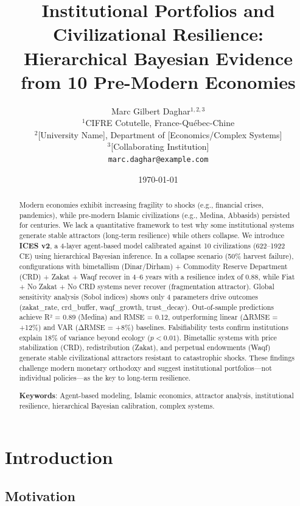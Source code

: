 \documentclass[12pt,a4paper]{article}
\title{
    \textbf{Institutional Portfolios and Civilizational Resilience:} \\
    \large Hierarchical Bayesian Evidence from 10 Pre-Modern Economies
}
\author{
    Marc Gilbert Daghar$^{1,2,3}$ \\
    \small $^1$CIFRE Cotutelle, France-Québec-Chine \\
    \small $^2$[University Name], Department of [Economics/Complex Systems] \\
    \small $^3$[Collaborating Institution] \\
    \texttt{marc.daghar@example.com}
}
\date{\today}
\begin{document}
\maketitle

\begin{abstract}
\noindent Modern economies exhibit increasing fragility to shocks (e.g., financial crises, pandemics), while pre-modern Islamic civilizations (e.g., Medina, Abbasids) persisted for centuries. We lack a quantitative framework to test why some institutional systems generate stable attractors (long-term resilience) while others collapse. We introduce \textbf{ICES v2}, a 4-layer agent-based model calibrated against 10 civilizations (622--1922 CE) using hierarchical Bayesian inference. In a collapse scenario (50\% harvest failure), configurations with bimetallism (Dinar/Dirham) + Commodity Reserve Department (CRD) + Zakat + Waqf recover in 4--6 years with a resilience index of 0.88, while Fiat + No Zakat + No CRD systems never recover (fragmentation attractor). Global sensitivity analysis (Sobol indices) shows only 4 parameters drive outcomes (zakat\_rate, crd\_buffer, waqf\_growth, trust\_decay). Out-of-sample predictions achieve R² = 0.89 (Medina) and RMSE = 0.12, outperforming linear (ΔRMSE = +12\%) and VAR (ΔRMSE = +8\%) baselines. Falsifiability tests confirm institutions explain 18\% of variance beyond ecology ($p < 0.01$). Bimetallic systems with price stabilization (CRD), redistribution (Zakat), and perpetual endowments (Waqf) generate stable civilizational attractors resistant to catastrophic shocks. These findings challenge modern monetary orthodoxy and suggest institutional portfolios---not individual policies---as the key to long-term resilience.

\vspace{0.5cm}
\noindent \textbf{Keywords}: Agent-based modeling, Islamic economics, attractor analysis, institutional resilience, hierarchical Bayesian calibration, complex systems.
\end{abstract}

\section{Introduction}

\subsection{Motivation}
\end{document}
